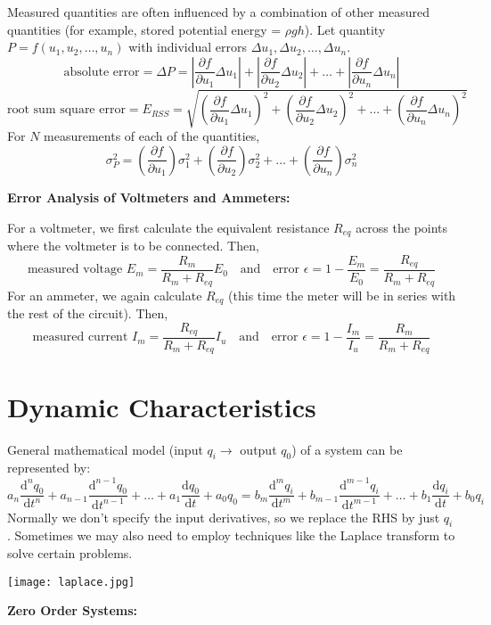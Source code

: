 \documentclass[11pt]{article}
\theoremstyle{definition}
\begin{document}
Measured quantities are often influenced by a combination of other measured quantities (for example, stored potential energy = $\rho gh$). Let quantity $P=f(u_1,u_2,\dots,u_n)$ with individual errors $\Delta u_1,\Delta u_2,\dots,\Delta u_n$. 
$$\text{absolute error}=\Delta P=\left|\frac{\partial f}{\partial u_1}\Delta u_1\right|+\left|\frac{\partial f}{\partial u_2}\Delta u_2\right|+\dots+\left|\frac{\partial f}{\partial u_n}\Delta u_n\right|$$
$$\text{root sum square error}=E_{RSS}=\sqrt{\left(\frac{\partial f}{\partial u_1}\Delta u_1\right)^2+\left(\frac{\partial f}{\partial u_2}\Delta u_2\right)^2+\dots+\left(\frac{\partial f}{\partial u_n}\Delta u_n\right)^2}$$
For $N$ measurements of each of the quantities,
$$\sigma_P^2=\left(\frac{\partial f}{\partial u_1}\right)\sigma_1^2+\left(\frac{\partial f}{\partial u_2}\right)\sigma_2^2+\dots+\left(\frac{\partial f}{\partial u_n}\right)\sigma_n^2$$

\textbf{\large Error Analysis of Voltmeters and Ammeters:}

For a voltmeter, we first calculate the equivalent resistance $R_{eq}$ across the points where the voltmeter is to be connected. Then,
$$\text{measured voltage }E_m=\frac{R_{m}}{R_m+R_{eq}}E_0\text{ }\text{  and  }\text{ }\text{error }\epsilon=1-\frac{E_m}{E_0}=\frac{R_{eq}}{R_m+R_{eq}}$$
For an ammeter, we again calculate $R_{eq}$ (this time the meter will be in series with the rest of the circuit). Then,
$$\text{measured current }I_m=\frac{R_{eq}}{R_m+R_{eq}}I_u\text{ }\text{ and }\text{ }\text{error }\epsilon=1-\frac{I_m}{I_u}=\frac{R_m}{R_m+R_{eq}}$$
\section{Dynamic Characteristics}
General mathematical model (input $q_i\rightarrow$ output $q_0$) of a system can be represented by:
$$a_{n}\frac{\text{d}^{n}q_{0}}{\text{d}t^{n}}+a_{n-1}\frac{\text{d}^{n-1}q_{0}}{\text{d}t^{n-1}}+\dots+a_{1}\frac{\text{d}q_{0}}{\text{d}t}+a_0q_0=b_{m}\frac{\text{d}^{m}q_{i}}{\text{d}t^{m}}+b_{m-1}\frac{\text{d}^{m-1}q_{i}}{\text{d}t^{m-1}}+\dots+b_{1}\frac{\text{d}q_{i}}{\text{d}t}+b_0q_i$$
Normally we don't specify the input derivatives, so we replace the RHS by just $q_i$. Sometimes we may also need to employ techniques like the Laplace transform to solve certain problems.
\vspace{-2mm}

\begin{center}
\texttt{[image: laplace.jpg]}
\end{center}
\textbf{\large Zero Order Systems:}
\end{document}
